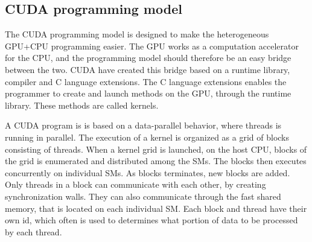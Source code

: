 
\subsection{CUDA programming model} %
\label{ssub:cuda_programming_model}

The CUDA programming model is designed to make the heterogeneous GPU+CPU programming easier. The GPU works as a computation accelerator for the CPU, and the programming model should therefore be an easy bridge between the two. CUDA have created this bridge based on a runtime library, compiler and C language extensions. The C language extensions enables the programmer to create and launch methods on the GPU, through the runtime library. These methods are called kernels.

A CUDA program is is based on a data-parallel behavior, where threads is running in parallel. The execution of a kernel is organized as a grid of blocks consisting of threads. When a kernel grid is launched, on the host CPU, blocks of the grid is enumerated and distributed among the SMs. The blocks then executes concurrently on individual SMs. As blocks terminates, new blocks are added. Only threads in a block can communicate with each other, by creating synchronization walls. They can also communicate through the fast shared memory, that is located on each individual SM. Each block and thread have their own id, which often is used to determines what portion of data to be processed by each thread.



\cleardoublepage
